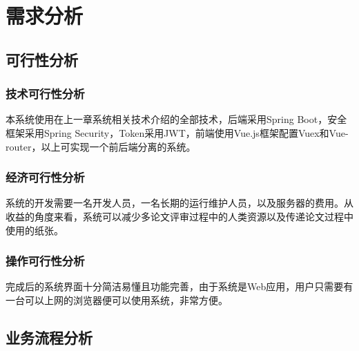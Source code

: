 
\chapter{需求分析}
\label{需求分析}

\section{可行性分析}

\subsection{技术可行性分析}

本系统使用在上一章系统相关技术介绍的全部技术，后端采用Spring Boot，安全框架采用Spring Security，Token采用JWT，前端使用Vue.js框架配置Vuex和Vue-router，以上可实现一个前后端分离的系统。

\subsection{经济可行性分析}

系统的开发需要一名开发人员，一名长期的运行维护人员，以及服务器的费用。从收益的角度来看，系统可以减少多论文评审过程中的人类资源以及传递论文过程中使用的纸张。

\subsection{操作可行性分析}

完成后的系统界面十分简洁易懂且功能完善，由于系统是Web应用，用户只需要有一台可以上网的浏览器便可以使用系统，非常方便。

\section{业务流程分析}

